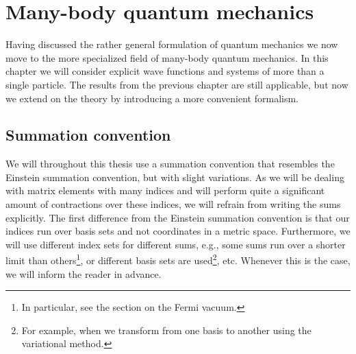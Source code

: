 \chapter{Many-body quantum mechanics}
    Having discussed the rather general formulation of quantum mechanics we now
    move to the more specialized field of many-body quantum mechanics.
    In this chapter we will consider explicit wave functions and systems of more
    than a single particle.
    The results from the previous chapter are still applicable, but now we
    extend on the theory by introducing a more convenient formalism.

    \section{Summation convention}
        We will throughout this thesis use a summation convention that
        resembles the Einstein summation convention, but with slight
        variations.
        As we will be dealing with matrix elements with many indices and will
        perform quite a significant amount of contractions over these indices,
        we will refrain from writing the sums explicitly.
        The first difference from the Einstein summation convention is that our
        indices run over basis sets and not coordinates in a metric space.
        Furthermore, we will use different index sets for different sums, e.g.,
        some sums run over a shorter limit than others\footnote{%
            In particular, see the section on the Fermi vacuum.%
        }, or different basis sets are used\footnote{%
            For example, when we transform from one basis to another using the
            variational method.%
        }, etc.
        Whenever this is the case, we will inform the reader in advance.

